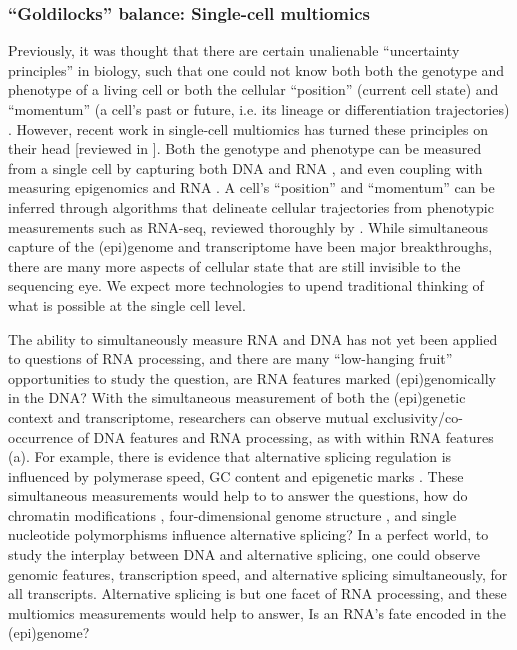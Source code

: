 \subsubsection{``Goldilocks'' balance: Single-cell multiomics}

Previously, it was thought that there are certain unalienable ``uncertainty principles'' in biology, such that one could not know both both the genotype and phenotype of a living cell \cite{Strippoli2005-ko} or both the cellular ``position'' (current cell state) and ``momentum'' (a cell's past or future, i.e. its lineage or differentiation trajectories) \cite{Shapiro2013-kk}. However, recent work in single-cell multiomics has turned these principles on their head [reviewed in \citet{Macaulay2017-tb}]. Both the genotype and phenotype can be measured from a single cell by capturing both DNA and RNA \cite{Macaulay2015-iz,Reuter2016-op}, and even coupling with measuring epigenomics and RNA \cite{Angermueller2016-rx,Hou2016-zi}. A cell's ``position'' and ``momentum'' can be inferred through algorithms that delineate cellular trajectories from phenotypic measurements such as RNA-seq, reviewed thoroughly by \citet{Cannoodt2016-mt}. While simultaneous capture of the (epi)genome and transcriptome have been major breakthroughs, there are many more aspects of cellular state that are still invisible to the sequencing eye. We expect more technologies to upend traditional thinking of what is possible at the single cell level.

The ability to simultaneously measure RNA and DNA has not yet been applied to questions of RNA processing, and there are many ``low-hanging fruit'' opportunities to study the question, are RNA features marked (epi)genomically in the DNA? With the simultaneous measurement of both the (epi)genetic context and transcriptome, researchers can observe mutual exclusivity/co-occurrence of DNA features and RNA processing, as with within RNA features (a). For example, there is evidence that alternative splicing regulation is influenced by polymerase speed, GC content and epigenetic marks \cite{Fiszbein2017-vl,Kornblihtt2013-gm,Tilgner2010-ia}. These simultaneous measurements would help to to answer the questions, how do chromatin modifications \cite{Calo2013-xx,Ng1999-tp}, four-dimensional genome structure \cite{Dekker2017-yg}, and single nucleotide polymorphisms influence alternative splicing? In a perfect world, to study the interplay between DNA and alternative splicing, one could observe genomic features, transcription speed, and alternative splicing simultaneously, for all transcripts. Alternative splicing is but one facet of RNA processing, and these multiomics measurements would help to answer, Is an RNA's fate encoded in the (epi)genome?

